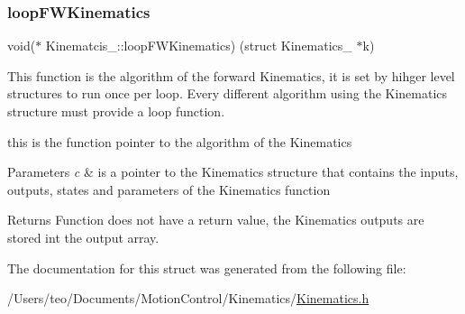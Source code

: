 \subsubsection{\texorpdfstring{loop\+F\+W\+Kinematics}{loopFWKinematics}}
{\footnotesize\ttfamily void($\ast$ Kinematcis\+\_\+\+::loop\+F\+W\+Kinematics) (struct Kinematics\+\_\+ $\ast$k)}



This function is the algorithm of the forward Kinematics, it is set by hihger level structures to run once per loop. Every different algorithm using the Kinematics structure must provide a loop function. 

this is the function pointer to the algorithm of the Kinematics 
\begin{DoxyParams}{Parameters}
{\em c} & is a pointer to the Kinematics structure that contains the inputs, outputs, states and parameters of the Kinematics function \\
\hline
\end{DoxyParams}
\begin{DoxyReturn}{Returns}
Function does not have a return value, the Kinematics outputs are stored int the output array. 
\end{DoxyReturn}


The documentation for this struct was generated from the following file\+:\begin{DoxyCompactItemize}
\item 
/\+Users/teo/\+Documents/\+Motion\+Control/\+Kinematics/\hyperlink{_kinematics_8h}{Kinematics.\+h}\end{DoxyCompactItemize}
